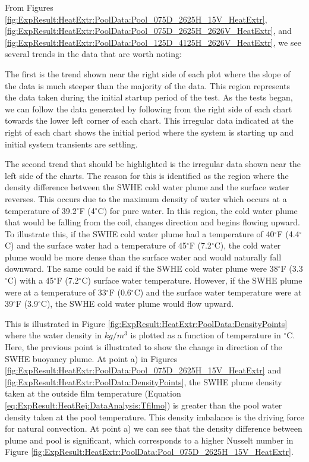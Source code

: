 From Figures \ref{fig:ExpResult:HeatExtr:PoolData:Pool_075D_2625H_15V_HeatExtr}, \ref{fig:ExpResult:HeatExtr:PoolData:Pool_075D_2625H_2626V_HeatExtr},
and \ref{fig:ExpResult:HeatExtr:PoolData:Pool_125D_4125H_2626V_HeatExtr}, we see several trends in the data that are worth noting: 

The first is the trend shown near the right side of each plot where the slope of the data is much steeper than the majority of the data. This region represents the data taken during the initial startup period of the test. As the tests began, we can follow the data generated by following from the right side of each chart towards the lower left corner of each chart. This irregular data indicated at the right of each chart shows the initial period where the system is starting up and initial system transients are settling. 

The second trend that should be highlighted is the irregular data shown near the left side of the charts. The reason for this is identified as the region where the density difference between the SWHE cold water plume and the surface water reverses. This occurs due to the maximum density of water which occurs at a temperature of 39.2$^\circ$F (4$^\circ$C) for pure water. In this region, the cold water plume that would be falling from the coil, changes direction and begins flowing upward. To illustrate this, if the SWHE cold water plume had a temperature of 40$^\circ$F (4.4$^\circ$C) and the surface water had a temperature of 45$^\circ$F (7.2$^\circ$C), the cold water plume would be more dense than the surface water and would naturally fall downward. The same could be said if the SWHE cold water plume were 38$^\circ$F (3.3$^\circ$C) with a 45$^\circ$F (7.2$^\circ$C) surface water temperature. However, if the SWHE plume were at a temperature of 33$^\circ$F (0.6$^\circ$C) and the surface water temperature were at 39$^\circ$F (3.9$^\circ$C), the SWHE cold water plume would flow upward. 
	
This is illustrated in Figure \ref{fig:ExpResult:HeatExtr:PoolData:DensityPoints} where the water density in $kg/m^3$ is plotted as a function of temperature in $^\circ$C. Here, the previous point is illustrated to show the change in direction of the SWHE buoyancy plume. At point a) in Figures \ref{fig:ExpResult:HeatExtr:PoolData:Pool_075D_2625H_15V_HeatExtr} and \ref{fig:ExpResult:HeatExtr:PoolData:DensityPoints}, the SWHE plume density taken at the outside film temperature (Equation \ref{eq:ExpResult:HeatRej:DataAnalysis:Tfilmo}) is greater than the pool water density taken at the pool temperature. This density imbalance is the driving force for natural convection. At point a) we can see that the density difference between plume and pool is significant, which corresponds to a higher Nusselt number in Figure \ref{fig:ExpResult:HeatExtr:PoolData:Pool_075D_2625H_15V_HeatExtr}. 
	
